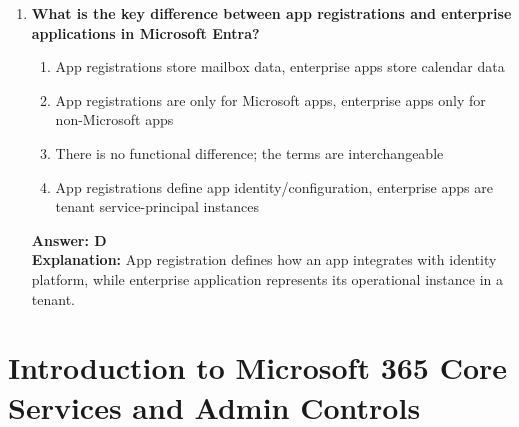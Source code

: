 \documentclass[10pt]{article}
\begin{document}
\begin{enumerate}[leftmargin=*]
\item \textbf{What is the key difference between app registrations and enterprise applications in Microsoft Entra?}
\begin{enumerate}[label=\Alph*.]
  \item App registrations store mailbox data, enterprise apps store calendar data
  \item App registrations are only for Microsoft apps, enterprise apps only for non-Microsoft apps
  \item There is no functional difference; the terms are interchangeable
  \item App registrations define app identity/configuration, enterprise apps are tenant service-principal instances
\end{enumerate}
\textbf{Answer: D}\\
\textbf{Explanation:} App registration defines how an app integrates with identity platform, while enterprise application represents its operational instance in a tenant.

\end{enumerate}
\clearpage
\section{Introduction to Microsoft 365 Core Services and Admin Controls}
\clearpage
\end{document}
